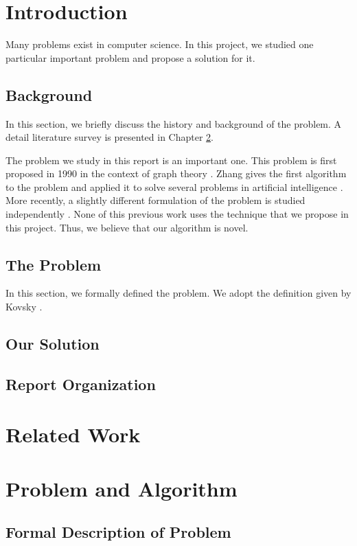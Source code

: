 \documentclass[fyp,12pt]{socreport}
\begin{document}
\listoffigures 
\listoftables
\tableofcontents 

\chapter{Introduction}
Many problems exist in computer science.  In this project, we 
studied one particular important problem and propose a solution 
for it.  

\section{Background}
In this section, we briefly discuss the history and background
of the problem.  A detail literature survey is presented in 
Chapter \ref{ch:related}.

The problem we study in this report is an important one.
This problem is first proposed in 1990 in the context
of graph theory \cite{smith90graph}.  Zhang gives the
first algorithm to the problem and applied it to solve several 
problems in artificial intelligence \cite{zhang91ai,zhang92ai}.  
More recently, a slightly different formulation of the problem
is studied independently \cite{kovsky92diff,ali94diff}.  None of this previous work
uses the technique that we propose in this project.  Thus, we 
believe that our algorithm is novel.

\section{The Problem}
In this section, we formally defined the problem.  We adopt
the definition given by Kovsky \cite{kovsky92diff}.

\section{Our Solution}
\section{Report Organization}

\chapter{Related Work}
\label{ch:related}

\chapter{Problem and Algorithm}
\section{Formal Description of Problem}
\end{document}
